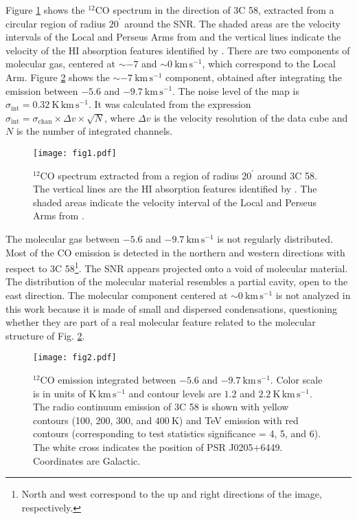 \documentclass[baaa]{baaa}
\begin{document}
Figure \ref{Fig1} shows the $^{12}$CO spectrum in the direction of 3C 58, extracted from a circular region of radius $20^{\prime}$ around the SNR. The shaded areas are the velocity intervals of the Local and Perseus Arms from \cite{peek22} and the vertical lines indicate the velocity of the HI absorption features identified by \citet{kothes13}. There are two components of molecular gas, centered at $\sim -7$ and $\sim 0~\mathrm{km\,s^{-1}}$, which correspond to the Local Arm. Figure \ref{Fig2} shows the $\sim -7~\mathrm{km\,s^{-1}}$ component, obtained after integrating the emission between $-5.6$ and $-9.7~\mathrm{km\,s^{-1}}$. The noise level of the map is $\sigma_{\mathrm{int}} = 0.32~\mathrm{K\,km\,s^{-1}}$. It was calculated from the expression $\sigma_{\mathrm{int}} = \sigma_{\mathrm{chan}} \times \Delta v \times \sqrt{N}$, where $\Delta v$ is the velocity resolution of the data cube and $N$ is the number of integrated channels. 

\begin{figure}[h]
\centering
\texttt{[image: fig1.pdf]}
\caption{$^{12}$CO spectrum extracted from a region of radius $20^{\prime}$ around 3C 58. The vertical lines are the HI absorption features identified by \cite{kothes13}. The shaded areas indicate the velocity interval of the Local and Perseus Arms from \cite{peek22}.}
\label{Fig1}
\end{figure}

The molecular gas between $-5.6$ and $-9.7~\mathrm{km\,s^{-1}}$ is not regularly distributed. Most of the CO emission is detected in the northern and western directions with respect to 3C 58\footnote{North and west correspond to the up and right directions of the image, respectively.}. The SNR appears projected onto a void of molecular material. The distribution of the molecular material resembles a partial cavity, open to the east direction.   
The molecular component centered at $\sim 0~\mathrm{km\,s^{-1}}$ is not analyzed in this work because it is made of small and dispersed condensations, questioning whether they are part of a real molecular feature related to the molecular structure of Fig. \ref{Fig2}.

\begin{figure}[t]
\centering
\texttt{[image: fig2.pdf]}
\caption{$^{12}$CO emission integrated between $-5.6$ and $-9.7~\mathrm{km\,s^{-1}}$. Color scale is in units of $\mathrm{K\,km\,s^{-1}}$ and contour levels are $1.2$ and $2.2~\mathrm{K \,km\,s^{-1}}$. The radio continuum emission of 3C 58 is shown with yellow contours (100, 200, 300, and $400~\mathrm{K}$) and TeV emission with red contours (corresponding to test statistics significance = 4, 5, and 6). The white cross indicates the position of PSR J0205$+$6449. Coordinates are Galactic.}
\label{Fig2} 
\end{figure}
\end{document}
